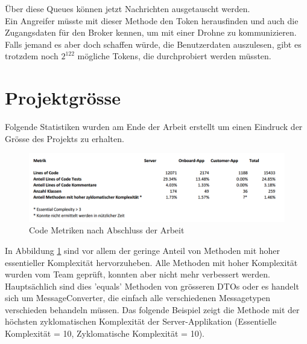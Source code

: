 Über diese Queues können jetzt Nachrichten ausgetauscht werden. \\

Ein Angreifer müsste mit dieser Methode den Token herausfinden und auch die Zugangsdaten für den Broker kennen, um mit einer Drohne zu kommunizieren. Falls jemand es aber doch schaffen würde, die Benutzerdaten auszulesen, gibt es trotzdem noch $2^{122}$ mögliche Tokens, die durchprobiert werden müssten. \\

\section{Projektgrösse}

Folgende Statistiken wurden am Ende der Arbeit erstellt um einen Eindruck der Grösse des Projekts zu erhalten.\\

\begin{figure}[H]
	\centering
	\includegraphics[width=1.0\textwidth] {images/code-metrics.png}
	\caption{Code Metriken nach Abschluss der Arbeit}
	\label{fig:code-metrics}
\end{figure}

In Abbildung \ref{fig:code-metrics} sind vor allem der geringe Anteil von Methoden mit hoher essentieller Komplexität\cite[S. 79]{MCCABE} hervorzuheben. Alle Methoden mit hoher Komplexität wurden vom Team geprüft, konnten aber nicht mehr verbessert werden. Hauptsächlich sind dies 'equals' Methoden von grösseren \Gls{DTO}s oder es handelt sich um MessageConverter, die einfach alle verschiedenen Messagetypen verschieden behandeln müssen. Das folgende Beispiel zeigt die Methode mit der höchsten zyklomatischen Komplexität der Server-Applikation (Essentielle Komplexität = 10, Zyklomatische Komplexität = 10). \\


